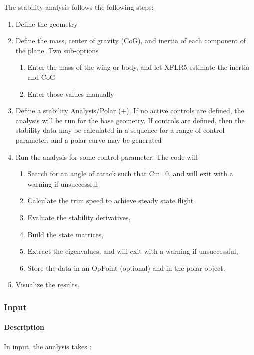 \documentclass[a4paper,twoside,12pt,dvips]{article}
\begin{document}
The stability analysis follows the following steps:

\begin{enumerate}
\item Define the geometry
\item Define the mass, center of gravity (CoG), and inertia of each component
of the plane. Two sub-options
\begin{enumerate}
\item Enter the mass of the wing or body, and let XFLR5 estimate the inertia
and CoG
\item Enter those values manually
\end{enumerate}
\item Define a stability Analysis/Polar (\Shift+).\newline
If no active controls are defined, the analysis will be run for the base
geometry.\newline
If controls are defined, then the stability data may be calculated in a
sequence for a range of control parameter, and a polar curve may be
generated
\item Run the analysis for some control parameter. The code will
\begin{enumerate}
\item Search for an angle of attack such that Cm=0, and will exit with a
warning if unsuccessful
\item Calculate the trim speed to achieve steady state flight
\item Evaluate the stability derivatives,
\item Build the state matrices,
\item Extract the eigenvalues, and will exit with a warning if unsuccessful,
\item Store the data in an OpPoint (optional) and in the polar object.
\end{enumerate}
\item Visualize the results.
\end{enumerate}

\subsubsection{Input}

\paragraph{Description}

In input, the analysis takes :
\end{document}
